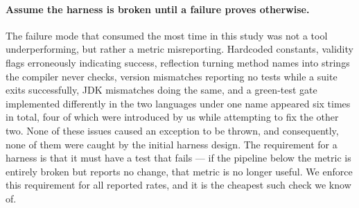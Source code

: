 \paragraph{Assume the harness is broken until a failure proves otherwise.}
The failure mode that consumed the most time in this study was not a tool underperforming, but
rather a metric misreporting. Hardcoded constants, validity flags erroneously indicating
success, reflection turning method names into strings the compiler never checks, version
mismatches reporting no tests while a suite exits successfully, JDK mismatches doing the same,
and a green-test gate implemented differently in the two languages under one name appeared six
times in total, four of which were introduced by us while attempting to fix the other two. None
of these issues caused an exception to be thrown, and consequently, none of them were caught by
the initial harness design. The requirement for a harness is that it must have a test that
fails --- if the pipeline below the metric is entirely broken but reports no change, that metric
is no longer useful. We enforce this requirement for all reported rates, and it is the cheapest
such check we know of.
